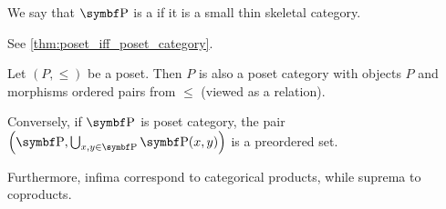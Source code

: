 \begin{definition}\label{def:poset_category}
  We say that \( \Cat{P} \) is a  if it is a small thin skeletal category.

  See \cref{thm:poset_iff_poset_category}.
\end{definition}

\begin{proposition}\label{thm:poset_iff_poset_category}
  Let \( (P, \leq) \) be a poset. Then \( P \) is also a poset category with objects \( P \) and morphisms ordered pairs from \( \leq \) (viewed as a relation).

  Conversely, if \( \Cat{P} \) is poset category, the pair \( \left(\Bold{P}, \bigcup_{x, y \in \Bold{P}} \Bold{P}(x, y) \right) \) is a preordered set.

  Furthermore, infima correspond to categorical products, while suprema to coproducts.
\end{proposition}
